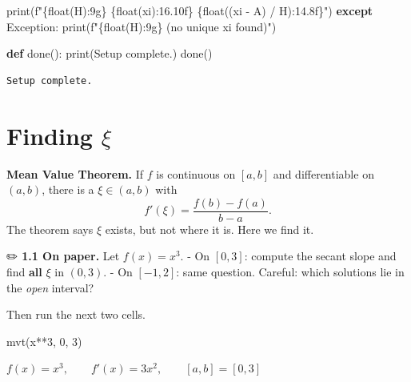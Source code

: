 \documentclass[
  letterpaper,
  DIV=11,
  numbers=noendperiod]{scrreprt}
\newenvironment{Shaded}{\begin{snugshade}}{\end{snugshade}}
\newcommand{\BuiltInTok}[1]{\textcolor[rgb]{0.00,0.23,0.31}{#1}}
\newcommand{\ControlFlowTok}[1]{\textcolor[rgb]{0.00,0.23,0.31}{\textbf{#1}}}
\newcommand{\DecValTok}[1]{\textcolor[rgb]{0.68,0.00,0.00}{#1}}
\newcommand{\KeywordTok}[1]{\textcolor[rgb]{0.00,0.23,0.31}{\textbf{#1}}}
\newcommand{\NormalTok}[1]{\textcolor[rgb]{0.00,0.23,0.31}{#1}}
\newcommand{\OperatorTok}[1]{\textcolor[rgb]{0.37,0.37,0.37}{#1}}
\newcommand{\PreprocessorTok}[1]{\textcolor[rgb]{0.68,0.00,0.00}{#1}}
\newcommand{\SpecialCharTok}[1]{\textcolor[rgb]{0.37,0.37,0.37}{#1}}
\newcommand{\SpecialStringTok}[1]{\textcolor[rgb]{0.13,0.47,0.30}{#1}}
\newcommand{\StringTok}[1]{\textcolor[rgb]{0.13,0.47,0.30}{#1}}
\theoremstyle{plain}
\theoremstyle{plain}
\theoremstyle{definition}
\theoremstyle{definition}
\theoremstyle{definition}
\theoremstyle{plain}
\theoremstyle{plain}
\theoremstyle{remark}
\begin{document}
\begin{Shaded}
\begin{Highlighting}[]
            \BuiltInTok{print}\NormalTok{(}\SpecialStringTok{f"}\SpecialCharTok{\{}\BuiltInTok{float}\NormalTok{(H)}\SpecialCharTok{:9g\}}\SpecialStringTok{ }\SpecialCharTok{\{}\BuiltInTok{float}\NormalTok{(xi)}\SpecialCharTok{:16.10f\}}\SpecialStringTok{ }\SpecialCharTok{\{}\BuiltInTok{float}\NormalTok{((xi }\OperatorTok{{-}}\NormalTok{ A) }\OperatorTok{/}\NormalTok{ H)}\SpecialCharTok{:14.8f\}}\SpecialStringTok{"}\NormalTok{)}
        \ControlFlowTok{except} \PreprocessorTok{Exception}\NormalTok{:}
            \BuiltInTok{print}\NormalTok{(}\SpecialStringTok{f"}\SpecialCharTok{\{}\BuiltInTok{float}\NormalTok{(H)}\SpecialCharTok{:9g\}}\SpecialStringTok{   (no unique xi found)"}\NormalTok{)}


\KeywordTok{def}\NormalTok{ done():}
    \BuiltInTok{print}\NormalTok{(}\StringTok{\textquotesingle{}Setup complete.\textquotesingle{}}\NormalTok{)}
\NormalTok{done()}
\end{Highlighting}
\end{Shaded}

\begin{verbatim}
Setup complete.
\end{verbatim}

\section{\texorpdfstring{Finding
\(\xi\)}{Finding \textbackslash xi}}\label{finding-xi}

\textbf{Mean Value Theorem.} If \(f\) is continuous on \([a,b]\) and
differentiable on \((a,b)\), there is a \(\xi\in(a,b)\) with
\[f'(\xi) = \frac{f(b)-f(a)}{b-a}.\] The theorem says \(\xi\) exists,
but not where it is. Here we find it.

✏️ \textbf{1.1 On paper.} Let \(f(x) = x^3\). - On \([0,3]\): compute
the secant slope and find \textbf{all} \(\xi\) in \((0,3)\). - On
\([-1,2]\): same question. Careful: which solutions lie in the
\emph{open} interval?

Then run the next two cells.

\begin{Shaded}
\begin{Highlighting}[]
\NormalTok{mvt(x}\OperatorTok{**}\DecValTok{3}\NormalTok{, }\DecValTok{0}\NormalTok{, }\DecValTok{3}\NormalTok{)}
\end{Highlighting}
\end{Shaded}

$\displaystyle f(x) = x^{3}, \qquad f'(x) = 3 x^{2}, \qquad [a,b] = [0, 3]$
\end{document}
